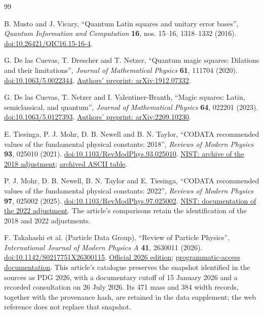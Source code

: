 \begin{thebibliography}{99}
\setlength{\itemsep}{0.10\baselineskip}
{}

B. Musto and J. Vicary,
``Quantum Latin squares and unitary error bases'',
\emph{Quantum Information and Computation} \textbf{16},
nos. 15--16, 1318--1332 (2016).
\href{https://doi.org/10.26421/QIC16.15-16-4}{doi:10.26421/QIC16.15-16-4}.

G. De las Cuevas, T. Drescher and T. Netzer,
``Quantum magic squares: Dilations and their limitations'',
\emph{Journal of Mathematical Physics} \textbf{61}, 111704 (2020).
\href{https://doi.org/10.1063/5.0022344}{doi:10.1063/5.0022344}.
\href{https://arxiv.org/abs/1912.07332}{Authors' preprint: arXiv:1912.07332}.

G. De las Cuevas, T. Netzer and I. Valentiner-Branth,
``Magic squares: Latin, semiclassical, and quantum'',
\emph{Journal of Mathematical Physics} \textbf{64}, 022201 (2023).
\href{https://doi.org/10.1063/5.0127393}{doi:10.1063/5.0127393}.
\href{https://arxiv.org/abs/2209.10230}{Authors' preprint: arXiv:2209.10230}.

E. Tiesinga, P. J. Mohr, D. B. Newell and B. N. Taylor,
``CODATA recommended values of the fundamental physical constants: 2018'',
\emph{Reviews of Modern Physics} \textbf{93}, 025010 (2021).
\href{https://doi.org/10.1103/RevModPhys.93.025010}{doi:10.1103/RevModPhys.93.025010}.
\href{https://physics.nist.gov/cuu/Constants/archive2018.html}{NIST: archive of the 2018 adjustment};
\href{https://physics.nist.gov/cuu/Constants/ArchiveASCII/allascii_2018.txt}{archived ASCII table}.

P. J. Mohr, D. B. Newell, B. N. Taylor and E. Tiesinga,
``CODATA recommended values of the fundamental physical constants: 2022'',
\emph{Reviews of Modern Physics} \textbf{97}, 025002 (2025).
\href{https://doi.org/10.1103/RevModPhys.97.025002}{doi:10.1103/RevModPhys.97.025002}.
\href{https://physics.nist.gov/cuu/Constants/article2022.html}{NIST: documentation of the 2022 adjustment}.
The article's comparisons retain the identification of the 2018 and 2022 adjustments.

F. Takahashi et al. (Particle Data Group),
``Review of Particle Physics'',
\emph{International Journal of Modern Physics A} \textbf{41}, 2630011 (2026).
\href{https://doi.org/10.1142/S0217751X26300115}{doi:10.1142/S0217751X26300115}.
\href{https://pdg.lbl.gov/2026/}{Official 2026 edition};
\href{https://pdg.lbl.gov/2026/api/index.html}{programmatic-access documentation}.
This article's catalogue preserves the snapshot identified in the sources
as PDG 2026, with a documentary cutoff of 15 January 2026 and a recorded consultation
on 26 July 2026. Its 471 mass and 384 width records, together with the
provenance hash, are retained in the data supplement; the web
reference does not replace that snapshot.

\end{thebibliography}
